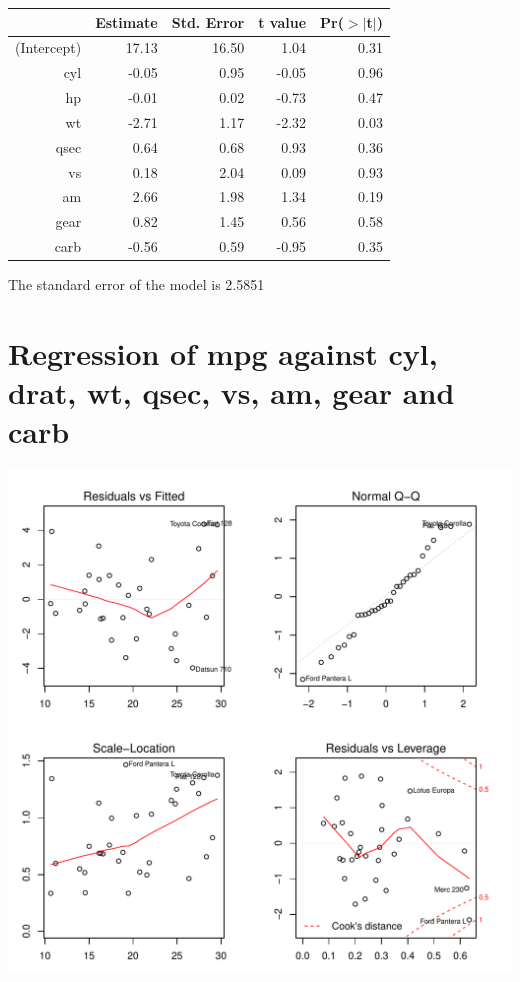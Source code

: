 \documentclass{article}\usepackage[]{graphicx}\usepackage[]{color}
\makeatletter
\def\maxwidth{ %
  \ifdim\Gin@nat@width>\linewidth
    \linewidth
  \else
    \Gin@nat@width
  \fi
}
\newenvironment{knitrout}{}{} %
\makeatother
\begin{document}
\begin{table}[ht]
\centering
\begin{tabular}{rrrrr}
  \hline
 & Estimate & Std. Error & t value & Pr($>$$|$t$|$) \\ 
  \hline
(Intercept) & 17.13 & 16.50 & 1.04 & 0.31 \\ 
  cyl & -0.05 & 0.95 & -0.05 & 0.96 \\ 
  hp & -0.01 & 0.02 & -0.73 & 0.47 \\ 
  wt & -2.71 & 1.17 & -2.32 & 0.03 \\ 
  qsec & 0.64 & 0.68 & 0.93 & 0.36 \\ 
  vs & 0.18 & 2.04 & 0.09 & 0.93 \\ 
  am & 2.66 & 1.98 & 1.34 & 0.19 \\ 
  gear & 0.82 & 1.45 & 0.56 & 0.58 \\ 
  carb & -0.56 & 0.59 & -0.95 & 0.35 \\ 
   \hline
\end{tabular}
\end{table}




The standard error of the model is 2.5851

\newpage

\section{Regression of mpg against cyl, drat, wt, qsec, vs, am, gear and carb }
\begin{knitrout}
\color{fgcolor}

{\centering \includegraphics[width=\maxwidth]{figure/lm-cyl-drat-wt-qsec-vs-am-gear-carb} 

}



\end{knitrout}
\end{document}
